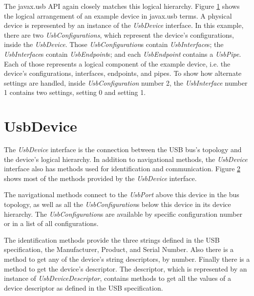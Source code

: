 \documentclass{article}
\newcommand{\myinterface}[1]{\emph{#1}}
\newcommand{\mysectionend}[0]{\vfill\pagebreak[1]}
\begin{document}
The javax.usb API again closely matches this logical hierarchy.  Figure \ref{device_hierarchy}
shows the logical arrangement of an example device in javax.usb terms.  A physical
device is represented by an instance of the \myinterface{UsbDevice} interface.  In this example,
there are two \myinterface{UsbConfigurations}, which represent the device's configurations,
inside the \myinterface{UsbDevice}.  Those \myinterface{UsbConfiguration}s
contain \myinterface{UsbInterface}s; the \myinterface{UsbInterface}s
contain \myinterface{UsbEndpoint}s; and each \myinterface{UsbEndpoint}
contains a \myinterface{UsbPipe}.  Each of those represents a logical component
of the example device, i.e. the device's configurations, interfaces, endpoints,
and pipes.  To show how alternate settings are handled, inside \myinterface{UsbConfiguration}
number 2, the \myinterface{UsbInterface} number 1 contains two settings, setting 0 and setting 1.

\begin{figure}
\label{device_hierarchy}
\end{figure}

\mysectionend

%

\section{UsbDevice}

The \myinterface{UsbDevice} interface is the connection between the USB bus's
topology and the device's logical hierarchy.  In addition to
navigational methods, the \myinterface{UsbDevice} interface also has methods
used for identification and communication.  Figure \ref{UsbDevice}
shows most of the methods provided by the \myinterface{UsbDevice} interface.

\begin{figure}
\label{UsbDevice}
\end{figure}

The navigational methods connect to the \myinterface{UsbPort} above this
device in the bus topology, as well as all the \myinterface{UsbConfiguration}s
below this device in its device hierarchy.  The \myinterface{UsbConfiguration}s
are available by specific configuration number or in a list of
all configurations.

The identification methods provide the three strings defined in
the USB specification, the Manufacturer, Product, and Serial Number.
Also there is a method to get any of the device's string descriptors,
by number.  Finally there is a method to get the device's descriptor.
The descriptor, which is represented by an instance of \myinterface{UsbDeviceDescriptor},
contains methods to get all the values of a device descriptor as
defined in the USB specification.
\end{document}
